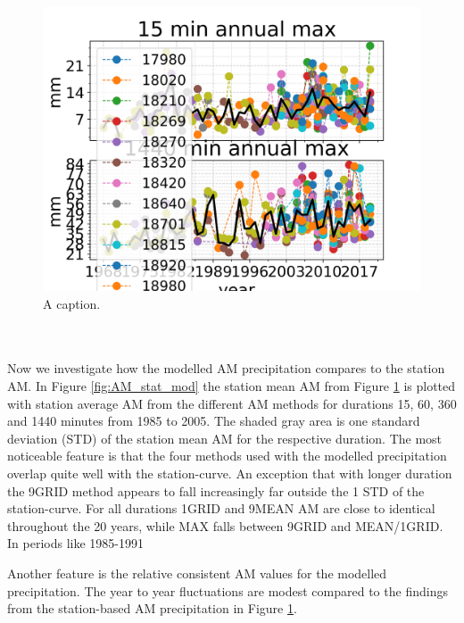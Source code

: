 \begin{figure}[hbt!]
    \centering
    \includegraphics[scale=0.8]{figures/AM_stations.png}
    \caption{A caption.}
    \label{fig:AM_stations}
\end{figure}
\\
\\
Now we investigate how the modelled AM precipitation compares to the station AM. In Figure \ref{fig:AM_stat_mod} the station mean AM from Figure \ref{fig:AM_stations} is plotted with station average AM from the different AM methods for durations 15, 60, 360 and 1440 minutes from 1985 to 2005. The shaded gray area is one standard deviation (STD) of the station mean AM for the respective duration. The most noticeable feature is that the four methods used with the modelled precipitation overlap quite well with the station-curve. An exception that with longer duration the 9GRID method appears to fall increasingly far outside the 1 STD of the station-curve. For all durations 1GRID and 9MEAN AM are close to identical throughout the 20 years, while MAX falls between 9GRID and MEAN/1GRID. In periods like 1985-1991 

Another feature is the relative consistent AM values for the modelled precipitation. The year to year fluctuations are modest compared to the findings from the station-based AM precipitation in Figure \ref{fig:AM_stations}.  

